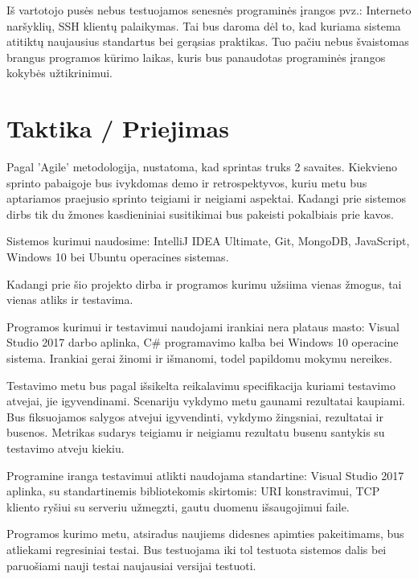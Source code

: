 \documentclass{VUMIFPSkursinis}
\begin{document}
Iš vartotojo pusės nebus testuojamos senesnės programinės įrangos pvz.: Interneto naršyklių, SSH klientų palaikymas.
Tai bus daroma dėl to, kad kuriama sistema atitiktų naujausius standartus bei gerąsias praktikas.
Tuo pačiu nebus švaistomas brangus programos kūrimo laikas, kuris bus panaudotas programinės įrangos kokybės užtikrinimui.


\section{Taktika / Priejimas}

Pagal 'Agile' metodologija, nustatoma, kad sprintas truks 2 savaites.
Kiekvieno sprinto pabaigoje bus ivykdomas demo ir retrospektyvos,
kuriu metu bus aptariamos praejusio sprinto teigiami ir neigiami aspektai.
Kadangi prie sistemos dirbs tik du žmones kasdieniniai susitikimai bus pakeisti pokalbiais prie kavos.

Sistemos kurimui naudosime: IntelliJ IDEA Ultimate, Git, MongoDB, JavaScript, Windows 10 bei Ubuntu operacines sistemas.













Kadangi prie šio projekto dirba ir programos kurimu užsiima vienas žmogus, tai vienas atliks ir testavima.

Programos kurimui ir testavimui naudojami irankiai nera plataus masto: Visual Studio 2017 darbo aplinka, C\# programavimo kalba bei Windows 10 operacine sistema. 
Irankiai gerai žinomi ir išmanomi, todel papildomu mokymu nereikes. 

Testavimo metu bus pagal išsikelta reikalavimu specifikacija kuriami testavimo atvejai, jie igyvendinami. 
Scenariju vykdymo metu gaunami rezultatai kaupiami. 
Bus fiksuojamos salygos atvejui igyvendinti, vykdymo žingsniai, rezultatai ir busenos. 
Metrikas sudarys teigiamu ir neigiamu rezultatu busenu santykis su testavimo atveju kiekiu. 

Programine iranga testavimui atlikti naudojama standartine: Visual Studio 2017 aplinka, su standartinemis bibliotekomis skirtomis: URI konstravimui, TCP kliento ryšiui su serveriu užmegzti, gautu duomenu išsaugojimui faile. 

Programos kurimo metu, atsiradus naujiems didesnes apimties pakeitimams, bus atliekami regresiniai testai. 
Bus testuojama iki tol testuota sistemos dalis bei paruošiami nauji testai naujausiai versijai testuoti. 
\end{document}
